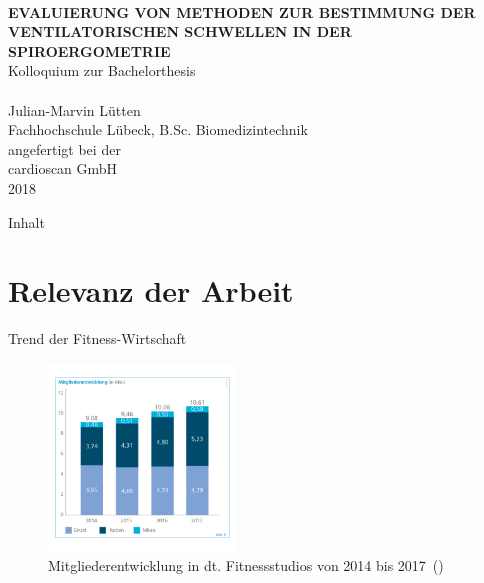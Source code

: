 \documentclass[colorBG,slideColor,8pt]{beamer}
\newcommand{\talktitle}{Evaluierung von Methoden zur Bestimmung der ventilatorischen Schwellen in der Spiroergometrie}
\begin{document}
\begin{frame}
    \vspace{-10ex}
    \textcolor{fhlred}{\HRuleFill[0.4ex]} \\ \vspace{1ex}
    {\linespread{1.5}\selectfont
    \MakeUppercase{\bf \huge \talktitle}\\[5.5ex]}
    \normalsize Kolloquium zur Bachelorthesis\\
    \textcolor{fhlred}{\HRuleFill[0.1ex]} \\ \vspace{4ex}
    \small Julian-Marvin Lütten\\
    \small Fachhochschule Lübeck, B.Sc. Biomedizintechnik\\
    \vspace{2ex}
    \small angefertigt bei der\\
    \small cardioscan GmbH\\
    \small 2018
\end{frame}

\begin{frame}{Inhalt}
\tableofcontents
\end{frame}

\section{Relevanz der Arbeit}

\begin{frame}{Trend der Fitness-Wirtschaft}
\begin{figure}[H]
	\includegraphics[width=5cm]{Bilder/Mitgliederentwicklung.png}
	\caption{Mitgliederentwicklung in dt. Fitnessstudios von 2014 bis 2017~(\cite{DSSV.2018})}
\end{figure}
\end{frame}
\end{document}
